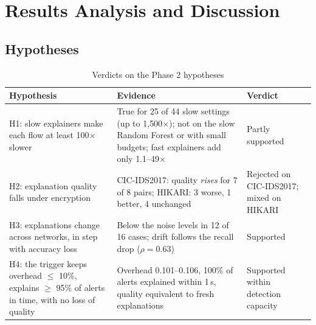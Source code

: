 \section{Results Analysis and Discussion}
\label{sec:discussion}

\subsection{Hypotheses}
\begin{table}[H]
\centering
\caption{Verdicts on the Phase 2 hypotheses}
\label{tab:verdicts}
\scriptsize
\setlength{\tabcolsep}{3.5pt}
\begin{tabularx}{\textwidth}{>{\raggedright\arraybackslash}p{4.3cm} Y >{\raggedright\arraybackslash}p{2.4cm}}
\toprule
\textbf{Hypothesis} & \textbf{Evidence} & \textbf{Verdict} \\
\midrule
H1: slow explainers make each flow at least 100$\times$ slower & True for 25 of 44 slow settings (up to 1{,}500$\times$); not on the slow Random Forest or with small budgets; fast explainers add only 1.1--49$\times$ & Partly supported \\
H2: explanation quality falls under encryption & CIC-IDS2017: quality \emph{rises} for 7 of 8 pairs; HIKARI: 3 worse, 1 better, 4 unchanged & Rejected on CIC-IDS2017; mixed on HIKARI \\
H3: explanations change across networks, in step with accuracy loss & Below the noise levels in 12 of 16 cases; drift follows the recall drop ($\rho=0.63$) & Supported \\
H4: the trigger keeps overhead $\le$ 10\%, explains $\ge$ 95\% of alerts in time, with no loss of quality & Overhead 0.101--0.106, 100\% of alerts explained within 1\,s, quality equivalent to fresh explanations & Supported within detection capacity \\
\bottomrule
\end{tabularx}
\end{table}

